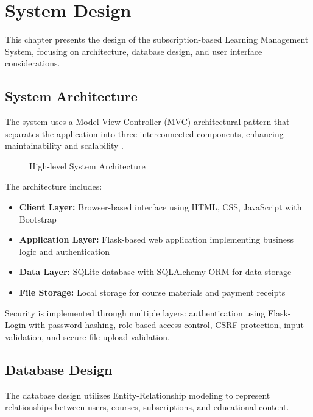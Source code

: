 \section{System Design}

This chapter presents the design of the subscription-based Learning Management System, focusing on architecture, database design, and user interface considerations.

\subsection{System Architecture}

The system uses a Model-View-Controller (MVC) architectural pattern that separates the application into three interconnected components, enhancing maintainability and scalability \cite{krasner1988}.

\begin{figure}[h]
\centering
\caption{High-level System Architecture}
\label{fig:architecture}
\end{figure}

The architecture includes:

\begin{itemize}
    \item \textbf{Client Layer:} Browser-based interface using HTML, CSS, JavaScript with Bootstrap
    \item \textbf{Application Layer:} Flask-based web application implementing business logic and authentication
    \item \textbf{Data Layer:} SQLite database with SQLAlchemy ORM for data storage
    \item \textbf{File Storage:} Local storage for course materials and payment receipts
\end{itemize}

Security is implemented through multiple layers: authentication using Flask-Login with password hashing, role-based access control, CSRF protection, input validation, and secure file upload validation.

\subsection{Database Design}

The database design utilizes Entity-Relationship modeling to represent relationships between users, courses, subscriptions, and educational content.

